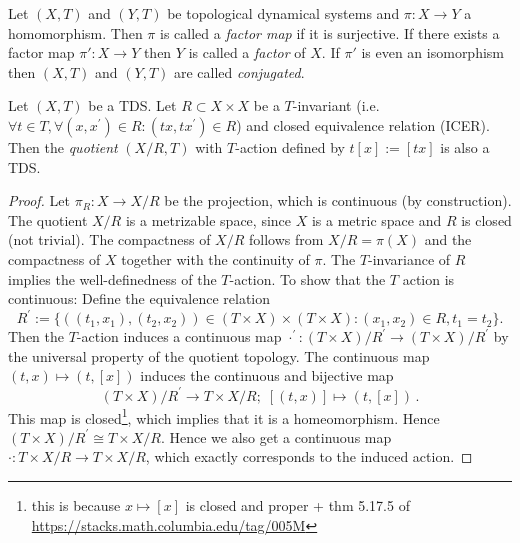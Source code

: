 \begin{definition}
	Let $(X, T)$ and $(Y, T)$ be topological dynamical systems and $\pi: X \to Y$ a homomorphism.
	Then $\pi$ is called a \emph{factor map} if it is surjective.
	If there exists a factor map $\pi': X \to Y$ then $Y$ is called a \emph{factor} of $X$.
	If $\pi'$ is even an isomorphism then $(X, T)$ and $(Y, T)$ are called \emph{conjugated}.
\end{definition}

\begin{proposition}
	Let $(X, T)$ be a TDS.
	Let $R \subset X \times X$ be a $T$-invariant (i.e.~$\forall t \in T, \forall (x, x^\prime ) \in R : (tx, tx^\prime) \in R$) and closed equivalence relation (ICER).
	Then the \emph{quotient} $(X/R, T)$ with $T$-action defined by $t[x] := [tx]$ is also a TDS.
\end{proposition}
\begin{proof}
	Let $\pi_R: X \to X/R$ be the projection, which is continuous (by construction).
	The quotient $X/R$ is a metrizable space, since $X$ is a metric space and $R$ is closed (not trivial).
	The compactness of $X/R$ follows from $X/R = \pi(X)$ and the compactness of $X$ together with the continuity of $\pi$.
	The $T$-invariance of $R$ implies the well-definedness of the $T$-action.
	To show that the $T$ action is continuous: Define the equivalence relation
	\begin{equation*}
		R^\prime := \{ ((t_1,x_1), (t_2,x_2)) \in (T \times X) \times (T \times X): (x_1, x_2) \in R, t_1 = t_2\}.
	\end{equation*}
	Then the $T$-action induces a continuous map $\cdot^\prime : (T \times X)/R^\prime \to (T\times X)/R^\prime$ by the universal property of the quotient topology.
	The continuous map $(t, x) \mapsto (t, [x])$ induces the continuous and bijective map
	\[ (T\times X)/R^\prime \longrightarrow T \times X / R; \; [(t, x)] \longmapsto (t, [x]) \,. \]
	This map is closed\footnote
	{this is because $x \mapsto [x]$ is closed and proper + thm 5.17.5 of \url{https://stacks.math.columbia.edu/tag/005M}},
	which implies that it is a homeomorphism.
	Hence $(T \times X) / R^\prime \cong T \times X / R$.
	Hence we also get a continuous map $\cdot : T \times X/R \to T\times X/R$, which exactly corresponds to the induced action.
\end{proof}

